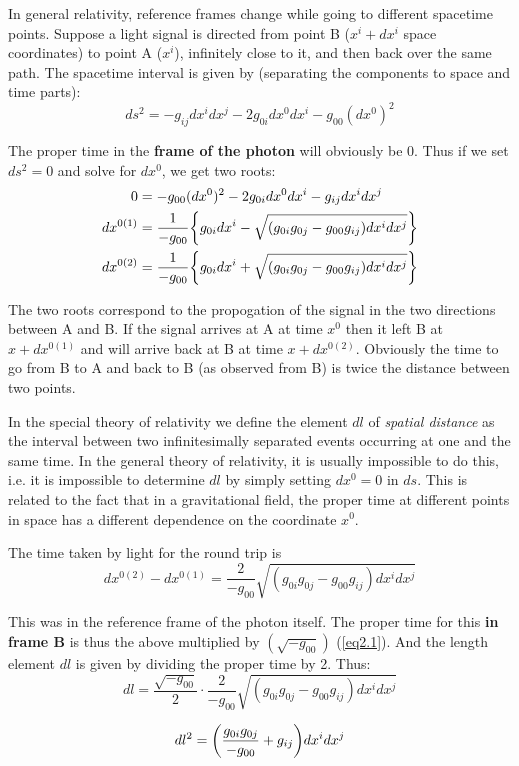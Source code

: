 \documentclass[12pt, letterpaper]{report}
\begin{document}
In general relativity, reference frames change while going to different spacetime points. Suppose a light signal is directed from point B ($x^i + dx^i$ space coordinates) to point A ($x^i$), infinitely close to it, and then back over the same path. The spacetime interval is given by (separating the components to space and time parts):
$$ds^2= -g_{ij}dx^idx^j-2g_{0i}dx^0dx^i-g_{00}(dx^0)^2$$

The proper time in the \textbf{frame of the photon} will obviously be 0. Thus if we set $ds^2=0$ and solve for $dx^0$, we get two roots: 
\begin{align*}
    0&= -g_{00}(dx^0)^2 -2g_{0i}dx^0dx^i -g_{ij}dx^idx^j\\
    dx^{0(1)} &= \frac{1}{-g_{00}}\qty{g_{0i}dx^i-\sqrt{(g_{0i}g_{0j}-g_{00}g_{ij})dx^idx^j}}\\
    dx^{0(2)} &= \frac{1}{-g_{00}}\qty{g_{0i}dx^i+\sqrt{(g_{0i}g_{0j}-g_{00}g_{ij})dx^idx^j}}
\end{align*}

The two roots correspond to the propogation of the signal in the two directions between A and B. If the signal arrives at A at time $x^0$ then it left B at $x+dx^{0(1)}$ and will arrive back at B at time $x+dx^{0(2)}$. Obviously the time to go from B to A and back to B (as observed from B) is twice the distance between two points.

In the special theory of relativity we define the element $dl$ of \emph{spatial distance} as the interval between two infinitesimally separated events occurring at one and the same time. In the general theory of relativity, it is usually impossible to do this, i.e. it is impossible to determine $dl$ by simply setting $dx^0=0$ in $ds$. This is related to the fact that in a gravitational field, the proper time at different points in space has a different dependence on the coordinate $x^0$.

The time taken by light for the round trip is 
$$dx^{0(2)}-dx^{0(1)}= \frac{2}{-g_{00}}\sqrt{(g_{0i}g_{0j}-g_{00}g_{ij})dx^idx^j}$$

This was in the reference frame of the photon itself. The proper time for this \textbf{in frame B} is thus the above multiplied by $(\sqrt{-g_{00}})$ (\cref{eq2.1}). And the length element $dl$ is given by dividing the proper time by 2. Thus: 
$$dl= \frac{\sqrt{-g_{00}}}{2}\cdot\frac{2}{-g_{00}}\sqrt{(g_{0i}g_{0j}-g_{00}g_{ij})dx^idx^j}$$    

\begin{equation}
    dl ^2= \qty(\frac{g_{0i}g_{0j}}{-g_{00}}+g_{ij})dx^idx^j \label{eq2.2}
\end{equation}
\end{document}
